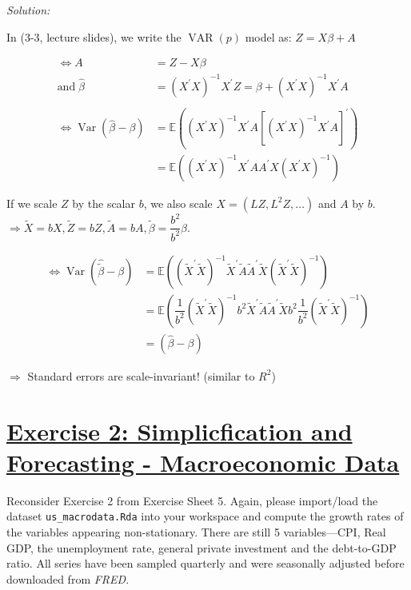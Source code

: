 \documentclass[12pt,a4paper]{article}
\newcommand{\Var}{\operatorname{Var}} %
\newcommand{\VAR}{\operatorname{VAR}} %
\newcommand{\tmpsection}[1]{}
\let\tmpsection=\section
\renewcommand{\section}[1]{\tmpsection{\underline{#1}} }
\begin{document}
\emph{Solution:}

In (3-3, lecture slides), we write the \(\VAR(p)\) model as:
\(Z = X\beta + A\)

\begin{align*}
  \Leftrightarrow A & = Z - X \beta \\
  \text{and} \;\hat{\beta} & = \left( X^{'} X\right)^{-1} X^{'} Z = \beta + \left( X^{'} X\right)^{-1} X^{'} A \\
  \\
  \Leftrightarrow  \Var \left( \hat{\beta} - \beta \right) & = \mathbb{E} \left( \left(X^{'} X \right)^{-1}  X^{'} A \left[ (X^{'} X)^{-1} X^{'} A \right]^{'} \right) \\
  & = \mathbb{E} \left( \left(X^{'} X \right)^{-1}  X^{'} A  A^{'} X \left(X^{'} X \right)^{-1} \right)
\end{align*}

If we scale \(Z\) by the scalar \(b\), we also scale
\(X = \left(LZ, L^2 Z, \ldots \right)\) and \(A\) by \(b\).
\(\Rightarrow \tilde{X} = bX, \tilde{Z} = bZ, \tilde{A} = bA, \tilde{\beta} = \dfrac{b^2}{b^2} \beta\).

\begin{align*}
  \Leftrightarrow \Var \left( \hat{\tilde{\beta}} - \beta \right) & = \mathbb{E} \left(\left(\tilde{X}^{'} \tilde{X} \right)^{-1} \tilde{X}^{'} \tilde{A} \tilde{A}^{'} \tilde{X} \left(\tilde{X}^{'} \tilde{X} \right)^{-1} \right)\\
   & = \mathbb{E} \left( \dfrac{1}{b^2} \left(\tilde{X}^{'} \tilde{X} \right)^{-1} b^2 \tilde{X}^{'} \tilde{A} \tilde{A}^{'} \tilde{X} b^2  \dfrac{1}{b^2}\left(\tilde{X}^{'} \tilde{X} \right)^{-1} \right) \\
   & = \left( \hat{\beta} - \beta \right)
\end{align*}

\(\Rightarrow\) Standard errors are scale-invariant! (similar to
\(R^2\))

\hypertarget{exercise-2-simplicfication-and-forecasting---macroeconomic-data}{%
\section{Exercise 2: Simplicfication and Forecasting - Macroeconomic
Data}\label{exercise-2-simplicfication-and-forecasting---macroeconomic-data}}

Reconsider Exercise 2 from Exercise Sheet 5. Again, please import/load
the dataset \texttt{us\_macrodata.Rda} into your workspace and compute
the growth rates of the variables appearing non-stationary. There are
still 5 variables---CPI, Real GDP, the unemployment rate, general
private investment and the debt-to-GDP ratio. All series have been
sampled quarterly and were seasonally adjusted before downloaded from
\emph{FRED}.
\end{document}
